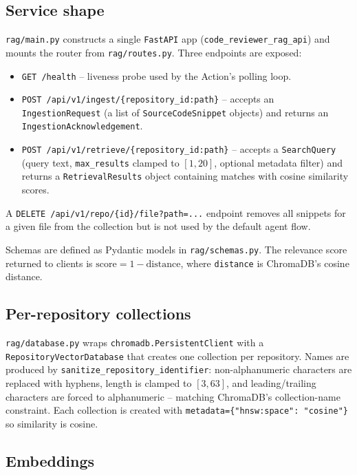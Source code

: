 \documentclass[11pt,a4paper]{article}
\newcommand{\code}[1]{\texttt{\small #1}}
\begin{document}
\subsection{Service shape}

\code{rag/main.py} constructs a single \code{FastAPI} app
(\code{code\_reviewer\_rag\_api}) and mounts the router from
\code{rag/routes.py}. Three endpoints are exposed:

\begin{itemize}[leftmargin=*]
  \item \code{GET /health} -- liveness probe used by the Action's polling
        loop.
  \item \code{POST /api/v1/ingest/\{repository\_id:path\}} -- accepts an
        \code{IngestionRequest} (a list of \code{SourceCodeSnippet} objects)
        and returns an \code{IngestionAcknowledgement}.
  \item \code{POST /api/v1/retrieve/\{repository\_id:path\}} -- accepts a
        \code{SearchQuery} (query text, \code{max\_results} clamped to
        $[1,20]$, optional metadata filter) and returns a
        \code{RetrievalResults} object containing matches with cosine
        similarity scores.
\end{itemize}

A \code{DELETE /api/v1/repo/\{id\}/file?path=...} endpoint removes all
snippets for a given file from the collection but is not used by the
default agent flow.

Schemas are defined as Pydantic models in \code{rag/schemas.py}. The
relevance score returned to clients is
$\mathrm{score} = 1 - \mathrm{distance}$, where \code{distance} is
ChromaDB's cosine distance.

\subsection{Per-repository collections}

\code{rag/database.py} wraps \code{chromadb.PersistentClient} with a
\code{RepositoryVectorDatabase} that creates one collection per repository.
Names are produced by \code{sanitize\_repository\_identifier}: non-alphanumeric
characters are replaced with hyphens, length is clamped to $[3, 63]$, and
leading/trailing characters are forced to alphanumeric -- matching ChromaDB's
collection-name constraint. Each collection is created with
\code{metadata=\{"hnsw:space": "cosine"\}} so similarity is cosine.

\subsection{Embeddings}
\end{document}
